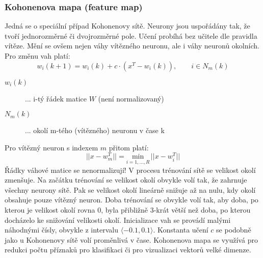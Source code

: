 \subsubsection*{Kohonenova mapa (feature map)}
Jedná se o speciální případ Kohonenovy sítě. Neurony jsou uspořádány tak, že tvoří jednorozměrné či dvojrozměrné pole. Učení probíhá bez učitele dle pravidla vítěze. Mění se ovšem nejen váhy vítězného neuronu, ale i váhy neuronů okolních. Pro změnu vah platí:
\begin{equation}
w_i(k+1) = w_i(k) + c \cdot (x^T - w_i(k)), \qquad i \in N_m(k)
\end{equation}
\begin{description}
\item[$ w_i(k) $] ... i-tý řádek matice $ W $ (není normalizovaný)
\item[$ N_m(k) $] ... okolí m-tého (vítězného) neuronu v čase k
\end{description}
Pro vítězný neuron s indexem $ m $ přitom platí:
\begin{equation}
||x-w_m^T|| = \underset{i=1,...,R}{\mathrm{min}} \, ||x-w_i^T||
\end{equation}
Řádky váhové matice se nenormalizují! V procesu trénování sítě se velikost okolí zmenšuje. Na začátku trénování se velikost okolí obvykle volí tak, že zahrnuje všechny neurony sítě. Pak se velikost okolí lineárně snižuje až na nulu, kdy okolí obsahuje pouze vítězný neuron. Doba trénování se obvykle volí tak, aby doba, po kterou je velikost okolí rovna 0, byla přibližně 3-krát větší než doba, po kterou docházelo ke snižování velikosti okolí. Inicializace vah se provádí malými náhodnými čísly, obvykle z intervalu $ \langle -0.1, 0.1 \rangle $. Konstanta učení $ c $ se podobně jako u Kohonenovy sítě volí proměnlivá v čase. Kohonenova mapa se využívá pro redukci počtu příznaků pro klasifikaci či pro vizualizaci vektorů velké dimenze.

